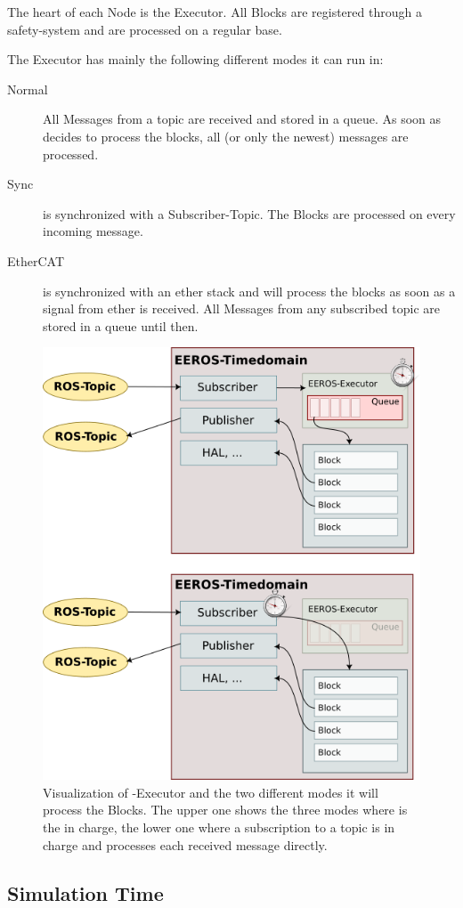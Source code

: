 The heart of each  Node is the Executor.
All Blocks are registered through a safety-system and are processed on a regular base.

The Executor has mainly the following different modes it can run in:

\begin{description}
    \item[Normal] All Messages from a \Gls{topic} are received and stored in a queue. As soon as  decides to process the blocks, all (or only the newest) messages are processed.
    \item[Sync]  is synchronized with a Subscriber-Topic. The Blocks are processed on every incoming message.
    \item[EtherCAT]  is synchronized with an \Gls{ether} stack and will process the blocks as soon as a signal from \Gls{ether} is received. All Messages from any subscribed \gls{topic} are stored in a queue until then.
\end{description}

\begin{figure}[H]
    \centering
    \includegraphics[width=0.6\linewidth]{images/eeros-executor}
    \caption[ Overview]{Visualization of -Executor and the two different modes it will process the Blocks. The upper one shows the three modes where  is the in charge, the lower one where a subscription to a topic is in charge and processes each received message directly.}
    \label{fig:eeros-overview}
\end{figure}


\subsection[Simulation time]{Simulation Time} \label{sec:simulation-time}

